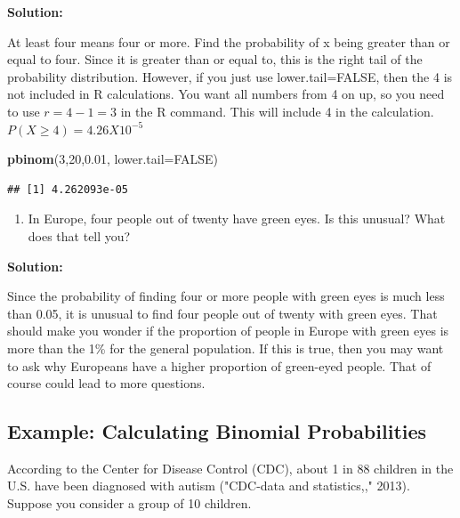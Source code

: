 \documentclass[]{book}
\newenvironment{Shaded}{\begin{snugshade}}{\end{snugshade}}
\newcommand{\DataTypeTok}[1]{\textcolor[rgb]{0.13,0.29,0.53}{#1}}
\newcommand{\DecValTok}[1]{\textcolor[rgb]{0.00,0.00,0.81}{#1}}
\newcommand{\FloatTok}[1]{\textcolor[rgb]{0.00,0.00,0.81}{#1}}
\newcommand{\KeywordTok}[1]{\textcolor[rgb]{0.13,0.29,0.53}{\textbf{#1}}}
\newcommand{\NormalTok}[1]{#1}
\newcommand{\OtherTok}[1]{\textcolor[rgb]{0.56,0.35,0.01}{#1}}
\providecommand{\tightlist}{%
  \setlength{\itemsep}{0pt}\setlength{\parskip}{0pt}}
\begin{document}
\textbf{Solution:}

At least four means four or more. Find the probability of x being
greater than or equal to four. Since it is greater than or equal to, this is the right tail of the probability distribution. However, if you just use lower.tail=FALSE, then the 4 is not included in R calculations. You want all numbers from 4 on up, so you need to use \(r=4-1=3\) in the R command. This will include 4 in the calculation. \(P(X \ge 4)=4.26X10^{-5}\)

\begin{Shaded}
\begin{Highlighting}[]
\KeywordTok{pbinom}\NormalTok{(}\DecValTok{3}\NormalTok{,}\DecValTok{20}\NormalTok{,}\FloatTok{0.01}\NormalTok{, }\DataTypeTok{lower.tail=}\OtherTok{FALSE}\NormalTok{)}
\end{Highlighting}
\end{Shaded}

\begin{verbatim}
## [1] 4.262093e-05
\end{verbatim}

\begin{enumerate}
\def\labelenumi{\alph{enumi}.}
\setcounter{enumi}{7}
\tightlist
\item
  In Europe, four people out of twenty have green eyes. Is this unusual? What does that tell you?
\end{enumerate}

\textbf{Solution:}

Since the probability of finding four or more people with green eyes is much less than 0.05, it is unusual to find four people out of twenty with green eyes. That should make you wonder if the proportion of people in Europe with green eyes is more than the 1\% for the general population. If this is true, then you may want to ask why Europeans have a higher proportion of green-eyed people. That of course could lead to more questions.

\hypertarget{example-calculating-binomial-probabilities-1}{%
\subsection{Example: Calculating Binomial Probabilities}\label{example-calculating-binomial-probabilities-1}}

According to the Center for Disease Control (CDC), about 1 in 88 children in the U.S. have been diagnosed with autism ("CDC-data and statistics,," 2013). Suppose you consider a group of 10 children.
\end{document}
